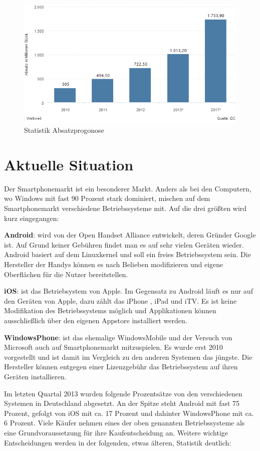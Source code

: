 \begin{figure}[H]
\centering
\includegraphics[width=0.7\linewidth]{../images/statista1.png}
\caption{Statistik Absatzprogonose}
\label{fig:statista1}
\end{figure}

\section{Aktuelle Situation}

Der Smartphonemarkt ist ein besonderer Markt. Anders als bei den Computern, wo Windows mit fast 90 Prozent stark dominiert, mischen auf dem Smartphonemarkt verschiedene Betriebssysteme mit. Auf die drei größten wird kurz eingegangen:

\textbf{Android}: wird von  der Open Handset Alliance entwickelt, deren Gründer Google ist. Auf Grund keiner Gebühren findet man es  auf sehr vielen Geräten wieder. Android basiert auf dem Linuxkernel und soll ein freies Betriebssystem sein. Die Hersteller der Handys können es nach Belieben modifizieren und eigene Oberflächen für die Nutzer bereitstellen.

\textbf{iOS}: ist das Betriebsystem von Apple. Im Gegensatz zu Android läuft es nur auf den Geräten von Apple, dazu zählt das iPhone , iPad und iTV. Es ist keine Modifikation des Betriebssystems möglich und Applikationen können ausschließlich über den eigenen Appstore installiert werden.
 
\textbf{WindowsPhone}:   ist das ehemalige WindowsMobile und der Versuch von Microsoft auch auf Smartphonemarkt mitzuspielen. Es wurde erst 2010 vorgestellt und ist damit im Vergleich zu den anderen Systemen das jüngste. Die Hersteller können entgegen einer Lizenzgebühr das Betriebssystem auf ihren Geräten installieren.


Im letzten Quartal 2013 wurden folgende Prozentsätze von den verschiedenen Systemen in Deutschland abgesetzt. An der Spitze steht Android mit fast 75 Prozent, gefolgt von iOS mit ca. 17 Prozent und dahinter WindowsPhone mit ca. 6 Prozent.
Viele Käufer nehmen eines der oben genannten Betriebssysteme als  eine Grundvoraussetzung für ihre Kaufentscheidung an. Weitere wichtige Entscheidungen werden in der folgenden, etwas älteren,  Statistik deutlich:

